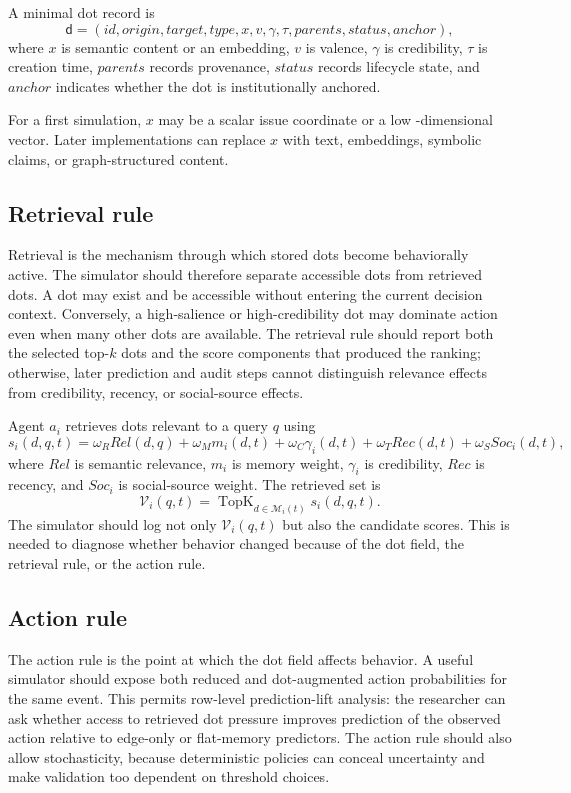 \documentclass[11pt]{article}
\theoremstyle{remark}
\begin{document}
A minimal dot record is
$$
\mathsf d=(id,origin,target,type,x,v,\gamma,\tau,parents,status,anchor),
$$
where $x$ is semantic content or an embedding, $v$ is valence, $\gamma$
is credibility, $\tau$ is creation time, $parents$ records provenance,
$status$ records lifecycle state, and $anchor$ indicates whether the dot
is institutionally anchored.

For a first simulation, $x$ may be a scalar issue coordinate or a low
-dimensional vector. Later implementations can replace $x$ with text,
embeddings, symbolic claims, or graph-structured content.

\subsection{Retrieval rule}\label{minimal-retrieval-rule}

Retrieval is the mechanism through which stored dots become behaviorally active. The simulator should therefore separate accessible dots from retrieved dots. A dot may exist and be accessible without entering the current decision context. Conversely, a high-salience or high-credibility dot may dominate action even when many other dots are available. The retrieval rule should report both the selected top-$k$ dots and the score components that produced the ranking; otherwise, later prediction and audit steps cannot distinguish relevance effects from credibility, recency, or social-source effects.


Agent $a_i$ retrieves dots relevant to a query $q$ using
$$
s_i(d,q,t)=
\omega_R Rel(d,q)+\omega_M m_i(d,t)+\omega_C\gamma_i(d,t)
+\omega_T Rec(d,t)+\omega_S Soc_i(d,t),
$$
where $Rel$ is semantic relevance, $m_i$ is memory weight, $\gamma_i$ is
credibility, $Rec$ is recency, and $Soc_i$ is social-source weight. The
retrieved set is
$$
\mathcal V_i(q,t)=\operatorname{TopK}_{d\in \mathcal M_i(t)}s_i(d,q,t).
$$
The simulator should log not only $\mathcal V_i(q,t)$ but also the
candidate scores. This is needed to diagnose whether behavior changed
because of the dot field, the retrieval rule, or the action rule.

\subsection{Action rule}\label{minimal-action-rule}

The action rule is the point at which the dot field affects behavior. A useful simulator should expose both reduced and dot-augmented action probabilities for the same event. This permits row-level prediction-lift analysis: the researcher can ask whether access to retrieved dot pressure improves prediction of the observed action relative to edge-only or flat-memory predictors. The action rule should also allow stochasticity, because deterministic policies can conceal uncertainty and make validation too dependent on threshold choices.
\end{document}
